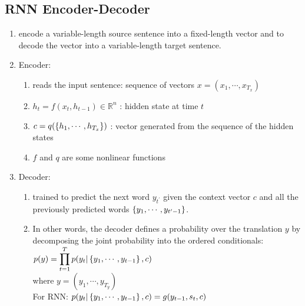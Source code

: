 \subsection{RNN Encoder-Decoder}
\begin{enumerate}
    \item encode a variable-length source sentence into a fixed-length vector and to decode the vector into a variable-length target sentence.
    \hfill \cite{adv-ml-tech/paper/arxiv.org/1409.0473}

    \item Encoder:
    \begin{enumerate}
        \item reads the input sentence: sequence of vectors $x = (x_1, \cdots, x_{T_x})$
        \hfill \cite{adv-ml-tech/paper/arxiv.org/1409.0473}

        \item $h_t = f(x_t, h_{t-1}) \in \mathbb{R}^n$ : hidden state at time $t$
        \hfill \cite{adv-ml-tech/paper/arxiv.org/1409.0473}

        \item $c = q(\left\{h_1, \cdots, h_{T_x}\right\})$ :  vector generated from the sequence of the hidden states
        \hfill \cite{adv-ml-tech/paper/arxiv.org/1409.0473}

        \item $f$ and $q$ are some nonlinear functions
        \hfill \cite{adv-ml-tech/paper/arxiv.org/1409.0473}
    \end{enumerate}

    \item Decoder:
    \begin{enumerate}
        \item trained to predict the next word $y_{t^\prime}$ given the context vector $c$ and all the previously predicted words $\left\{y_1, \cdots , y_{t^\prime-1}\right\}$. 
        \hfill \cite{adv-ml-tech/paper/arxiv.org/1409.0473}

        \item In other words, the decoder defines a probability over the translation $y$ by decomposing the joint probability into the ordered conditionals:\\
        $
            p(y)
            = \displaystyle\prod_{t=1}^T p(y_t | \left\{y_1, \cdots, y_{t-1}\right\}, c)
        $
        \hfill \cite{adv-ml-tech/paper/arxiv.org/1409.0473}
        \\
        where $y = (y_1, \cdots, y_{T_y})$
        \hfill \cite{adv-ml-tech/paper/arxiv.org/1409.0473}
        \\
        For RNN: 
        $
            p(y_t | \left\{y_1, \cdots, y_{t-1}\right\}, c)
            = g(y_{t-1}, s_t, c)
        $
        \hfill \cite{adv-ml-tech/paper/arxiv.org/1409.0473}
        

\end{enumerate}
\end{enumerate}
